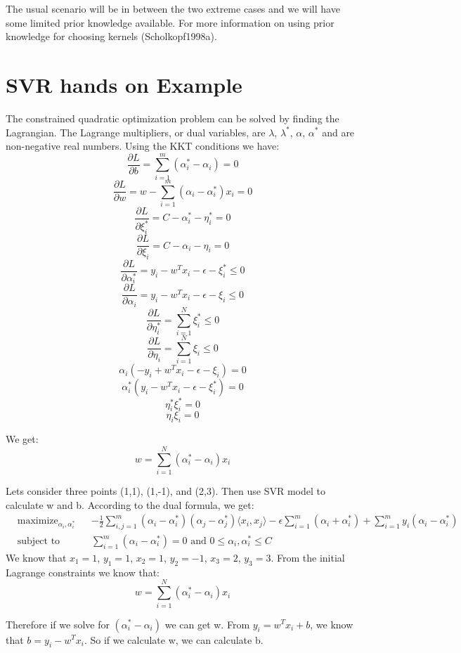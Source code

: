 \documentclass[fleqn,10pt]{olplainarticle}
\begin{document}
The usual scenario will be in between the two extreme cases and we will have some limited prior knowledge available. For more information on using prior knowledge for choosing kernels (Scholkopf1998a).

\section{SVR hands on Example}
The constrained quadratic optimization problem can be solved by finding the Lagrangian. The Lagrange multipliers, or dual variables, are $\lambda$, $\lambda^*$, $\alpha$, $\alpha^*$ and are non-negative real numbers. Using the KKT conditions we have:
\[
\frac{\partial L}{\partial b} = \sum_{i=1}^{m} (\alpha_i^* - \alpha_i) = 0
\]
\[
\frac{\partial L}{\partial w} = w - \sum_{i=1}^{m} (\alpha_i - \alpha_i^*)x_i = 0
\]
\[
\frac{\partial L}{\partial \xi_i^*} = C - \alpha_i^* - \eta_i^* = 0
\]
\[
\frac{\partial L}{\partial \xi_i} = C - \alpha_i - \eta_i = 0
\]
\[
\frac{\partial L}{\partial \alpha_i^*} = y_i - w^Tx_i - \epsilon -\xi_i^* \leq 0
\]
\[
\frac{\partial L}{\partial \alpha_i} = y_i - w^Tx_i - \epsilon -\xi_i \leq 0
\]
\[
\frac{\partial L}{\partial \eta_i^*} =\sum_{i=1}^N \xi_i^* \leq 0
\]
\[
\frac{\partial L}{\partial \eta_i} =\sum_{i=1}^N \xi_i \leq 0
\]
\[
\alpha_i(-y_i + w^Tx_i - \epsilon - \xi_i) = 0
\]
\[
\alpha_i^*(y_i - w^Tx_i - \epsilon - \xi_i^*) = 0
\]
\[
\eta_i^*\xi_i^* = 0
\]
\[
\eta_i\xi_i = 0
\]

We get:
\[
w = \sum_{i=1}^N(\alpha_i^* - \alpha_i)x_i
\]

Lets consider three points (1,1), (1,-1), and (2,3). Then use SVR model to calculate w and b.
According to the dual formula, we get:
\[
\begin{aligned}
&\text{maximize}_{\alpha_i, \alpha_i^*} && 
-\frac{1}{2} \sum_{i, j=1}^{m} (\alpha_i - \alpha_i^*)(\alpha_j - \alpha_j^*) \langle x_i, x_j \rangle -\epsilon \sum_{i=1}^{m} (\alpha_i + \alpha_i^*) + \sum_{i=1}^{m} y_i (\alpha_i - \alpha_i^*) \\
&\text{subject to} && \sum_{i=1}^{m} (\alpha_i - \alpha_i^*) = 0 \text{ and } 0 \leq \alpha_i, \alpha_i^* \leq C
\end{aligned}
\]
We know that $x_1 = 1$, $y_1 = 1$, $x_2 = 1$, $y_2 = -1$, $x_3 = 2$, $y_3 = 3$.
From the initial Lagrange constraints we know that:
\[
w = \sum_{i=1}^N(\alpha_i^* - \alpha_i)x_i
\]

Therefore if we solve for $(\alpha_i^* - \alpha_i)$ we can get w. From $y_i = w^Tx_i + b$, we know that  $b = y_i - w^Tx_i$. So if we calculate w, we can calculate b.
\end{document}
